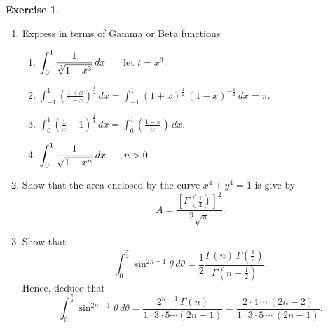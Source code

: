\documentclass[12pt,a4paper]{report}
\theoremstyle{definition}
\newtheorem{exe}[thm]{Exercise}
\theoremstyle{plain}
\begin{document}
\begin{exe}\textit{}
\vspace*{-5mm}
\begin{enumerate}
\item[(a).] Express in terms of Gamma or Beta functions
\begin{enumerate}
\item[(i).] $\displaystyle{\int_0^1 \frac{1}{\sqrt[3]{1 - x^3}}\, dx}\hspace{0.5cm}$ let $t = x^3.$\\

\item[(ii).] $\displaystyle{\int_{-1}^1 \left(\frac{1 + x}{1 - x}\right)^{\frac{1}{2}}\, dx = \int_{-1}^1(1 + x)^{\frac{1}{2}}\, (1 - x)^{-\frac{1}{2}}\, dx = \pi}$.\\

\item[(iii).] $\displaystyle{\int_0^1\left(\frac{1}{x} - 1\right)^{\frac{1}{4}}\, dx = \int_0^1 \left(\frac{1 - x}{x}\right)\, dx}$.\\

\item[(iv).] $\displaystyle{\int_0^1\frac{1}{\sqrt{1 - x^n}}\, dx\hspace{0.5cm}}, n > 0.$
\end{enumerate}
\item[(b).] Show that the area enclosed by the curve $x^4 + y^4 = 1$ is give by $$A = \frac{\left[\Gamma\left(\frac{1}{4}\right)\right]^2}{2\sqrt{\pi}}.$$

\item[(c).] Show that $$\int_0^{\frac{\pi}{2}} \sin^{2n-1}\theta\, d\theta = \frac{1}{2}\frac{\Gamma(n)\, \Gamma\left(\frac{1}{2}\right)}{\Gamma\left(n+\frac{1}{2}\right)}.$$ Hence, deduce that
$$\int_0^{\frac{\pi}{2}} \sin^{2n-1}\theta\, d\theta  = \frac{2^{n-1}\, \Gamma(n)}{1\cdot 3\cdot 5\cdots (2n-1)} = \frac{2\cdot 4\, \cdots\, (2n-2)}{1\cdot 3\cdot 5 \, \cdots\, (2n-1)}.$$
\end{enumerate}
\end{exe}
\end{document}
